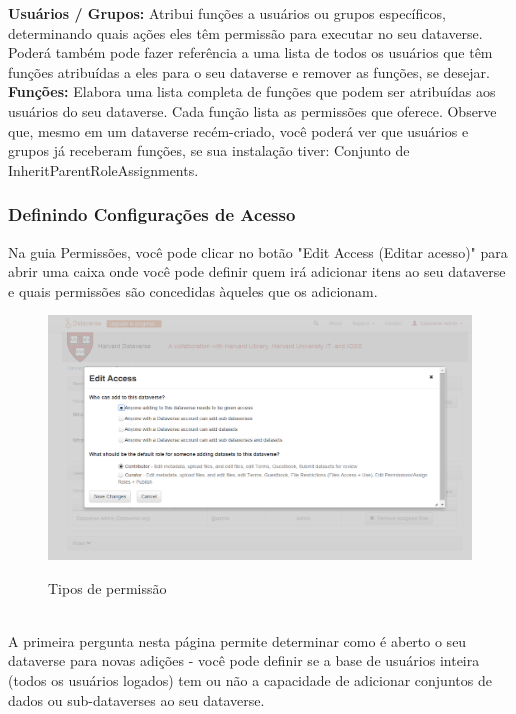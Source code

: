 \documentclass[12pt,hidelinks]{article}
\begin{document}
\textbf{Usuários / Grupos:} Atribui funções a usuários ou grupos específicos, determinando quais ações eles têm permissão para executar no seu dataverse. Poderá também pode fazer referência a uma lista de todos os usuários que têm funções atribuídas a eles para o seu dataverse e remover as funções, se desejar.\\

\textbf{Funções:} Elabora uma lista completa de funções que podem ser atribuídas aos usuários do seu dataverse. Cada função lista as permissões que oferece. Observe que, mesmo em um dataverse recém-criado, você poderá ver que usuários e grupos já receberam funções, se sua instalação tiver: Conjunto de InheritParentRoleAssignments.

        \subsubsection{Definindo Configurações de Acesso}
        
\qquad Na guia Permissões, você pode clicar no botão "Edit Access (Editar acesso)" para abrir uma caixa onde você pode definir quem irá adicionar itens ao seu dataverse e quais permissões são concedidas àqueles que os adicionam.
        
  \begin{figure}[H]
  \caption{Tipos de permissão}
         \centering
    \includegraphics[scale=0.4]{imagens/prt3.png}
    \label{Acesso}
    \end{figure}
  \\
  
 A primeira pergunta nesta página permite determinar como é aberto o seu dataverse para novas adições - você pode definir se a base de usuários inteira (todos os usuários logados) tem ou não a capacidade de adicionar conjuntos de dados ou sub-dataverses ao seu dataverse.
\end{document}
